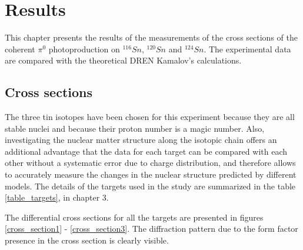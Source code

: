 \chapter{Results}

\indent This chapter presents the results of the measurements of the cross sections of the coherent $\pi^{0}$ photoproduction on $^{116}Sn$, $^{120}Sn$ and  $^{124}Sn$. The experimental data are compared with the theoretical DREN Kamalov's calculations.

\section{Cross sections}

\indent The three tin isotopes have been chosen for this experiment because they are all stable nuclei and because their proton number is a magic number. Also, investigating the nuclear matter structure along the isotopic chain offers an additional advantage that the data for each target can be compared with each other without a systematic error due to charge distribution, and therefore allows to accurately measure the changes in the nuclear structure predicted by different models. The details of the targets used in the study are summarized in the table \ref{table_targets}, in chapter 3.

\indent The differential cross sections for all the targets are presented in figures \ref{cross_section1} - \ref{cross_section3}. The diffraction pattern due to the form factor presence in the cross section is clearly visible.

